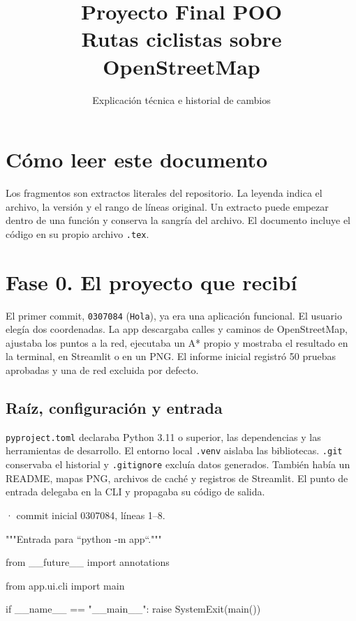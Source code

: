 \documentclass[11pt,a4paper]{article}
\title{Proyecto Final POO\\Rutas ciclistas sobre OpenStreetMap}
\author{Explicación técnica e historial de cambios}
\date{}
\begin{document}
\maketitle
\tableofcontents
\clearpage

\section*{Cómo leer este documento}
Los fragmentos son extractos literales del repositorio. La leyenda indica
el archivo, la versión y el rango de líneas original. Un extracto puede
empezar dentro de una función y conserva la sangría del archivo. El documento
incluye el código en su propio archivo \texttt{.tex}.

\section{Fase 0. El proyecto que recibí}
El primer commit, \texttt{0307084} (\texttt{Hola}), ya era una aplicación funcional. El usuario elegía dos coordenadas. La app descargaba calles y caminos de OpenStreetMap, ajustaba los puntos a la red, ejecutaba un A* propio y mostraba el resultado en la terminal, en Streamlit o en un PNG. El informe inicial registró 50 pruebas aprobadas y una de red excluida por defecto.

\subsection{Raíz, configuración y entrada}
\texttt{pyproject.toml} declaraba Python 3.11 o superior, las dependencias y las herramientas de desarrollo. El entorno local \texttt{.venv} aislaba las bibliotecas. \texttt{.git} conservaba el historial y \texttt{.gitignore} excluía datos generados. También había un README, mapas PNG, archivos de caché y registros de Streamlit. El punto de entrada delegaba en la CLI y propagaba su código de salida.

\smallskip
{\footnotesize\texttt{} · commit inicial 0307084, líneas 1--8.}\par
\begin{Codigo}[firstnumber=1]
"""Entrada para ``python -m app``."""

from __future__ import annotations

from app.ui.cli import main

if __name__ == "__main__":
    raise SystemExit(main())
\end{Codigo}
\end{document}

